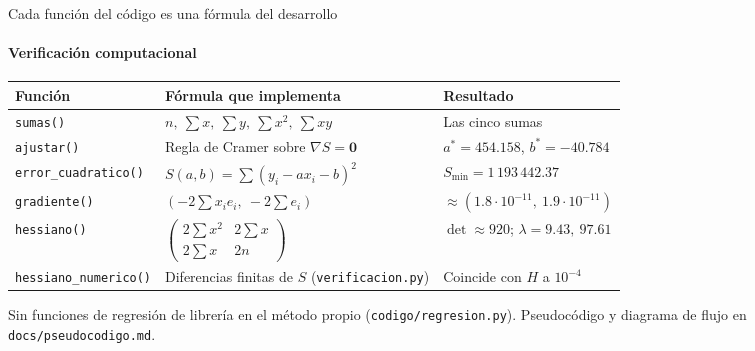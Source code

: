 \documentclass[aspectratio=169,11pt]{beamer}
\begin{document}
\begin{frame}{Cada función del código es una fórmula del desarrollo}
  \framesubtitle{Verificación computacional}
  \small
  \begin{tabularx}{\textwidth}{l >{\raggedright\arraybackslash}X l}
    \toprule
    \textbf{Función} & \textbf{Fórmula que implementa} & \textbf{Resultado} \\
    \midrule
    \texttt{sumas()} & $n,\ \sum x,\ \sum y,\ \sum x^2,\ \sum xy$ & Las cinco sumas \\
    \texttt{ajustar()} & Regla de Cramer sobre $\nabla S = \mathbf{0}$ & $a^* = 454.158$, $b^* = -40.784$ \\
    \texttt{error\_cuadratico()} & $S(a,b) = \sum (y_i - a x_i - b)^2$ & $S_{\min} = 1\,193\,442.37$ \\
    \texttt{gradiente()} & $\left(-2\sum x_i e_i,\ -2\sum e_i\right)$ & $\approx (1.8\cdot10^{-11},\ 1.9\cdot10^{-11})$ \\
    \texttt{hessiano()} & $\left(\begin{smallmatrix} 2\sum x^2 & 2\sum x \\ 2\sum x & 2n\end{smallmatrix}\right)$ & $\det \approx 920$; $\lambda = 9.43,\ 97.61$ \\
    \texttt{hessiano\_numerico()} & Diferencias finitas de $S$ (\texttt{verificacion.py}) & Coincide con $H$ a $10^{-4}$ \\
    \bottomrule
  \end{tabularx}
  \vfill
  {\footnotesize Sin funciones de regresión de librería en el método propio (\texttt{codigo/regresion.py}). Pseudocódigo y diagrama de flujo en \texttt{docs/pseudocodigo.md}.}
\end{frame}
\end{document}
